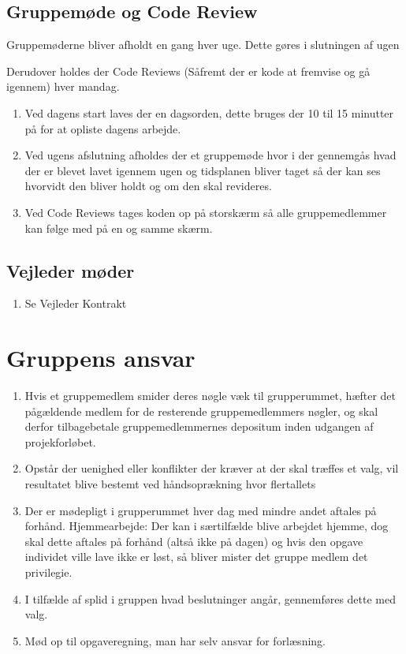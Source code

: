 \subsection{Gruppemøde og Code Review}
Gruppemøderne bliver afholdt en gang hver uge. Dette gøres i slutningen af ugen

Derudover holdes der Code Reviews (Såfremt der er kode at fremvise og gå igennem) hver mandag.

\begin{enumerate}
\item Ved dagens start laves der en dagsorden, dette bruges der 10 til 15 minutter på for at opliste dagens arbejde.
\item Ved ugens afslutning afholdes der et gruppemøde hvor i der gennemgås hvad der er blevet lavet igennem ugen og tidsplanen bliver taget så der kan ses hvorvidt den bliver holdt og om den skal revideres.
\item Ved Code Reviews tages koden op på storskærm så alle gruppemedlemmer kan følge med på en og samme skærm.
\end{enumerate}
\subsection{Vejleder møder}
\begin{enumerate}
\item Se Vejleder Kontrakt
\end{enumerate}

\section{Gruppens ansvar}
\begin{enumerate}
\item Hvis et gruppemedlem smider deres nøgle væk til grupperummet, hæfter det pågældende medlem for de resterende gruppemedlemmers nøgler, og skal derfor tilbagebetale gruppemedlemmernes depositum inden udgangen af projekforløbet.
\item Opstår der uenighed eller konflikter der kræver at der skal træffes et valg, vil resultatet blive bestemt ved håndsoprækning hvor flertallets
\begin{enumerate}

\end{enumerate}
\item Der er mødepligt i grupperummet hver dag med mindre andet aftales på forhånd.
Hjemmearbejde: Der kan i særtilfælde blive arbejdet hjemme, dog skal dette aftales på forhånd (altså ikke på dagen) og hvis den opgave individet ville lave ikke er løst, så bliver mister det gruppe medlem det privilegie.
\item I tilfælde af splid i gruppen hvad beslutninger angår, gennemføres dette med valg.
\item Mød op til opgaveregning, man har selv ansvar for forlæsning.
\end{enumerate}

